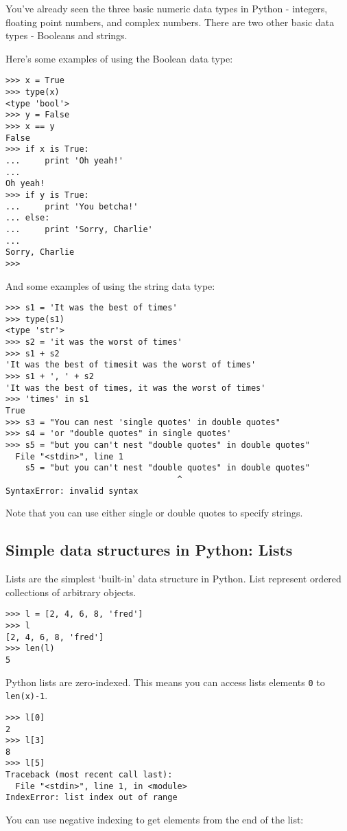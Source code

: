 You've already seen the three basic numeric data types in Python -
integers, floating point numbers, and complex numbers. There are two
other basic data types - Booleans and strings.

Here's some examples of using the Boolean data type:

\begin{lstlisting}
>>> x = True
>>> type(x)
<type 'bool'>
>>> y = False
>>> x == y
False
>>> if x is True:
...     print 'Oh yeah!'
... 
Oh yeah!
>>> if y is True:
...     print 'You betcha!'
... else:
...     print 'Sorry, Charlie'
... 
Sorry, Charlie
>>>
\end{lstlisting}
And some examples of using the string data type:

\begin{lstlisting}
>>> s1 = 'It was the best of times'
>>> type(s1)
<type 'str'>
>>> s2 = 'it was the worst of times'
>>> s1 + s2
'It was the best of timesit was the worst of times'
>>> s1 + ', ' + s2
'It was the best of times, it was the worst of times'
>>> 'times' in s1
True
>>> s3 = "You can nest 'single quotes' in double quotes"
>>> s4 = 'or "double quotes" in single quotes'
>>> s5 = "but you can't nest "double quotes" in double quotes"
  File "<stdin>", line 1
    s5 = "but you can't nest "double quotes" in double quotes"
                                   ^
SyntaxError: invalid syntax
\end{lstlisting}
Note that you can use either single or double quotes to specify strings.

\subsection{Simple data structures in Python: Lists}

Lists are the simplest `built-in' data structure in Python. List
represent ordered collections of arbitrary objects.

\begin{lstlisting}
>>> l = [2, 4, 6, 8, 'fred']
>>> l
[2, 4, 6, 8, 'fred']
>>> len(l)
5
\end{lstlisting}
Python lists are zero-indexed. This means you can access lists elements
\lstinline!0! to \lstinline!len(x)-1!.

\begin{lstlisting}
>>> l[0]
2
>>> l[3]
8
>>> l[5]
Traceback (most recent call last):
  File "<stdin>", line 1, in <module>
IndexError: list index out of range
\end{lstlisting}
You can use negative indexing to get elements from the end of the list:

